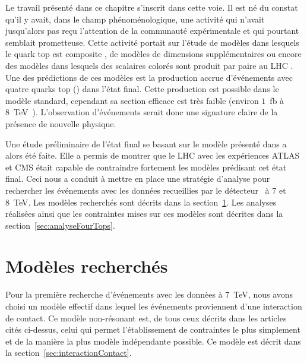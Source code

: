 Le travail pr\'esent\'e dans ce chapitre s'inscrit dans cette voie. Il est n\'e 
du constat qu'il y avait, dans le champ ph\'enom\'enologique, une activit\'e 
qui n'avait jusqu'alors pas re\c cu l'attention de la communaut\'e 
exp\'erimentale et qui pourtant semblait prometteuse. Cette activit\'e portait 
sur l'\'etude de mod\`eles dans lesquels le quark top est composite 
\cite{PhysRevD.51.3888,PhysRevD.78.074026,1126-6708-2008-04-087,
1126-6708-2009-05-022}, 
de mod\`eles de dimensions suppl\'ementaires \cite{Guchait:2007jd}
ou encore des mod\`eles dans lesquels des scalaires color\'es sont produit par paire au LHC \cite{Chen:2008hh,Gerbush:2007fe}.
Une des pr\'edictions de ces mod\`eles est la production accrue d'\'ev\'enements avec quatre quarks top (\fourtop) dans l'\'etat final. Cette production est possible dans le mod\`ele standard, cependant sa section efficace est tr\`es faible (environ $1$~fb \`a 8~TeV~\cite{Barger:2010uw}). L'observation d'\'ev\'enements \fourtop{} serait donc une signature claire de la pr\'esence de nouvelle physique. 

Une \'etude pr\'eliminaire de l'\'etat final \fourtop{} se basant sur le mod\`ele pr\'esent\'e dans \cite{1126-6708-2008-04-087} a alors \'et\'e faite. Elle a permis de montrer que le LHC avec les exp\'eriences ATLAS et CMS \'etait capable de contraindre fortement les mod\`eles pr\'edisant cet \'etat final. Ceci nous a conduit \`a mettre en place une strat\'egie d'analyse pour rechercher les \'ev\'enements \fourtop{} avec les donn\'ees recueillies par le d\'etecteur \ATLAS~\`a 7 et 8~TeV. Les mod\`eles recherch\'es sont d\'ecrits dans la section~\ref{sec:models}. Les analyses r\'ealis\'ees ainsi que les contraintes mises sur ces mod\`eles sont d\'ecrites dans la section~\ref{sec:analyseFourTops}.

\section{Mod\`eles recherch\'es}
\label{sec:models}

Pour la premi\`ere recherche d'\'ev\'enements \fourtop{} avec les donn\`ees \`a 7~TeV, nous avons choisi un mod\`ele effectif dans lequel les \'ev\'enements \fourtop{} proviennent d'une interaction de contact. Ce mod\`ele non-r\'esonant est, de tous ceux d\'ecrits dans les articles cit\'es ci-dessus, celui qui permet l'\'etablissement de contraintes le plus simplement et de la mani\`ere la plus mod\`ele ind\'ependante possible. Ce mod\`ele est d\'ecrit dans la section~\ref{sec:interactionContact}. 

